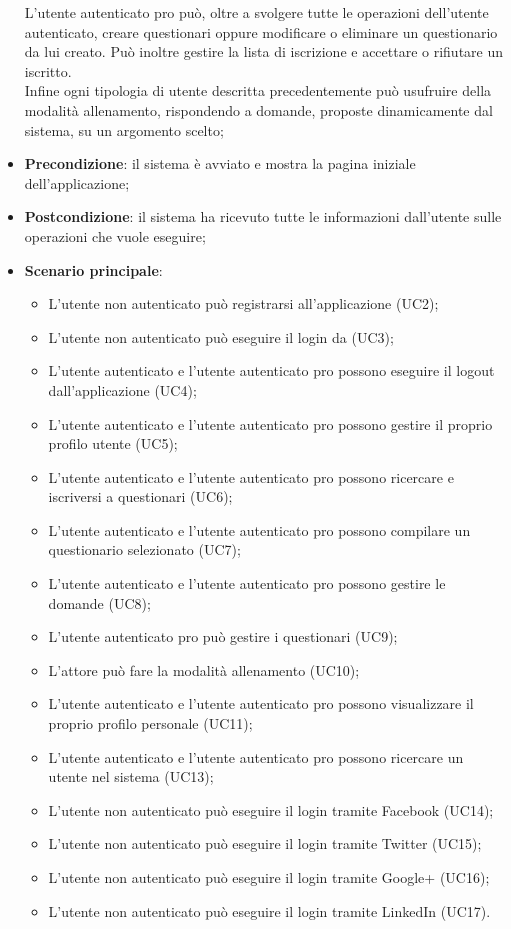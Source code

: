 \begin{itemize}
L'utente autenticato pro può, oltre a svolgere tutte le operazioni dell'utente autenticato, creare questionari oppure modificare o eliminare un questionario da lui creato. Può inoltre gestire la lista di iscrizione e accettare o rifiutare un iscritto.
\\ Infine ogni tipologia di utente descritta precedentemente può usufruire della modalità allenamento, rispondendo a domande, proposte dinamicamente dal sistema, su un argomento scelto;
\item\textbf{Precondizione}: il sistema è avviato e mostra la pagina iniziale dell'applicazione;
\item\textbf{Postcondizione}: il sistema ha ricevuto tutte le informazioni dall'utente sulle operazioni che vuole eseguire;
\item\textbf{Scenario principale}:
\begin{itemize}
\item L'utente non autenticato può registrarsi all'applicazione (UC2);
\item L'utente non autenticato può eseguire il login da \progetto (UC3);
\item L'utente autenticato e l'utente autenticato pro possono eseguire il logout dall'applicazione (UC4); 
\item L'utente autenticato e l'utente autenticato pro possono gestire il proprio profilo utente (UC5);
\item L'utente autenticato e l'utente autenticato pro possono ricercare e iscriversi a questionari (UC6);
\item L'utente autenticato e l'utente autenticato pro possono compilare un questionario selezionato (UC7);
\item L'utente autenticato e l'utente autenticato pro possono gestire le domande (UC8);
\item L'utente autenticato pro può gestire i questionari (UC9);
\item L'attore può fare la modalità allenamento (UC10);
\item L'utente autenticato e l'utente autenticato pro possono visualizzare il proprio profilo personale (UC11);
\item L'utente autenticato e l'utente autenticato pro possono ricercare un utente nel sistema (UC13);
\item L'utente non autenticato può eseguire il login tramite Facebook (UC14);
\item L'utente non autenticato può eseguire il login tramite Twitter (UC15);
\item L'utente non autenticato può eseguire il login tramite Google+ (UC16);
\item L'utente non autenticato può eseguire il login tramite LinkedIn (UC17).
\end{itemize}
\end{itemize}